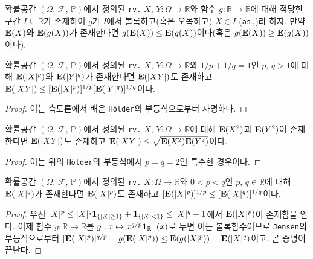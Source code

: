 \begin{theorem}
    확률공간 $(\Omega,\,\mathcal{F},\,\mathbb{P})$에서 정의된 \texttt{rv.} $X,\,Y:\Omega\to\mathbb{R}$와 함수 $g:\mathbb{R}\to\mathbb{R}$에 대해 적당한 구간 $I\subseteq\mathbb{R}$가 존재하여 $g$가 $I$에서 볼록하고(혹은 오목하고) $X\in I$ (\texttt{as.})라 하자. 만약 $\mathbf{E}(X)$와 $\mathbf{E}(g(X))$가 존재한다면 $g(\mathbf{E}(X))\leq\mathbf{E}(g(X))$이다(혹은 $g(\mathbf{E}(X))\geq\mathbf{E}(g(X))$이다).
\end{theorem}

\begin{theorem}
    확률공간 $(\Omega,\,\mathcal{F},\,\mathbb{P})$에서 정의된 \texttt{rv.} $X,\,Y:\Omega\to\mathbb{R}$와 $1/p+1/q=1$인 $p,\,q>1$에 대해 $\mathbf{E}(|X|^p)$와 $\mathbf{E}(|Y|^q)$가 존재한다면 $\mathbf{E}(|XY|)$도 존재하고 $\mathbf{E}(|XY|)\leq[\mathbf{E}(|X|^p)]^{1/p}[\mathbf{E}(|Y|^q)]^{1/q}$이다.
\end{theorem}

\begin{proof}
    이는 측도론에서 배운 \texttt{H\"older}의 부등식으로부터 자명하다.
\end{proof}

\begin{corollary}
    확률공간 $(\Omega,\,\mathcal{F},\,\mathbb{P})$에서 정의된 \texttt{rv.} $X,\,Y:\Omega\to\mathbb{R}$에 대해 $\mathbf{E}(X^2)$과 $\mathbf{E}(Y^2)$이 존재한다면 $\mathbf{E}(|XY|)$도 존재하고 $\mathbf{E}(|XY|)\leq\sqrt{\mathbf{E}(X^2)\mathbf{E}(Y^2)}$이다.
\end{corollary}

\begin{proof}
    이는 위의 \texttt{H\"older}의 부등식에서 $p=q=2$인 특수한 경우이다.
\end{proof}

\begin{theorem}
    확률공간 $(\Omega,\,\mathcal{F},\,\mathbb{P})$에서 정의된 \texttt{rv.} $X:\Omega\to\mathbb{R}$와 $0<p<q$인 $p,\,q\in\mathbb{R}$에 대해 $\mathbf{E}(|X|^q)$가 존재한다면 $\mathbf{E}(|X|^p)$도 존재하고 $[\mathbf{E}(|X|^p)]^{1/p}\leq[\mathbf{E}(|X|^q)]^{1/q}$이다.
\end{theorem}

\begin{proof}
    우선 $|X|^p\leq|X|^q\mathbf{1}_{\{|X|\geq1\}}+\mathbf{1}_{\{|X|<1\}}\leq|X|^q+1$에서 $\mathbf{E}(|X|^p)$이 존재함을 안다. 이제 함수 $g:\mathbb{R}\to\mathbb{R}$를 $g:x\mapsto x^{q/p}\mathbf{1}_{\mathbb{R}^+}(x)$로 두면 이는 볼록함수이므로 \texttt{Jensen}의 부등식으로부터 $[\mathbf{E}(|X|^p)]^{q/p}=g(\mathbf{E}(|X|^p))\leq\mathbf{E}(g(|X|^p))=\mathbf{E}(|X|^q)$이고, 곧 증명이 끝난다.
\end{proof}

